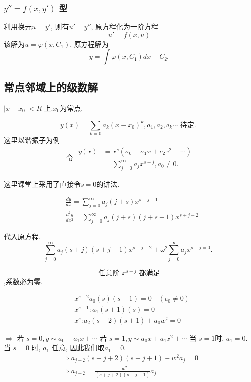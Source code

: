 \subsubsection{ $y'' = f(x, y')$ 型}
利用换元$u = y'$, 则有$u' = y''$, 原方程化为一阶方程
$$ u' = f(x,u)$$
该解为$u = \varphi(x, C_1)$, 原方程解为
\begin{equation}
    y = \int \varphi(x, C_1) dx  + C_2.
\end{equation}


\subsection{常点邻域上的级数解}
$\left|x-x_0\right|<R$ 上.$x_0$为常点.

$$
y(x)=\sum_{k=0} a_k\left(x-x_0\right)^k, a_1, a_2, a_k \cdots \text { 待定. }
$$
这里以谐振子为例
$$
\text { 令 } \begin{aligned}
y(x) & =x^s\left(a_0+a_1 x+c_2 x^2+\cdots\right) \\
& =\sum_{j=0}^{\infty} a_j x^{s+j}, a_0 \neq 0 .
\end{aligned}
$$

\begin{note}
这里课堂上采用了直接令$s=0$的讲法.
\end{note}
$$
\begin{aligned}
& \frac{d y}{d x}=\sum_{j=0}^{\infty} a_j(j+s) x^{s+j-1} \\
& \frac{d^2 y}{d x^2}=\sum_{j=0}^{\infty} a_j(j+s)(j+s-1) x^{s+j-2}
\end{aligned}
$$

代入原方程.
$$
\sum_{j=0}^{\infty} a_j(s+j)(s+j-1) x^{s+j-2}+\omega^2 \sum_{j=0}^{\infty} a_j x^{s+j=0} \text {. }
$$

$$
\text { 任意阶 } x^{s+j} \text { 都满足 }
$$
,系数必为零.

$$
\begin{aligned}
& x^{s-2} a_0(s)(s-1)=0 \quad\left(a_0 \neq 0\right) \\
& x^{s-1}: a_1(s+1)(s)=0 \\
& x^s: a_2(s+2)(s+1)+a_0 w^2=0
\end{aligned}
$$

$\Rightarrow$ 若 $s=0, y \sim  a_0+a_1 x+\cdots$
若 $s=1, y \sim a_0 x+a_1 x^2+\cdots$
当 $s=1$时, $a_1=0$.
当 $s=0$ 时, $a_1$ 任意, 因此我们取$a_1=0$.
$$
\begin{gathered}
\Rightarrow a_{j+2}(s+j+2)(s+j+1)+w^2 a_j=0 \\
\Rightarrow a_{j+2}=\frac{-w^2}{(s+j+2)(s+j+1)} a_j
\end{gathered}
$$

